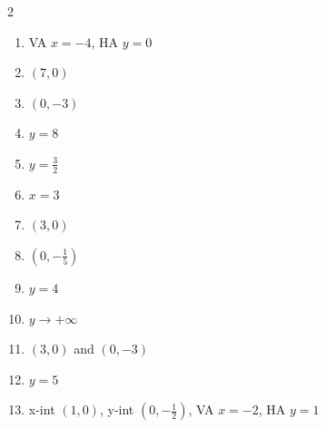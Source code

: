 \documentclass[11pt]{article}
\begin{document}
\begin{keybox}
\begin{multicols}{2}
\small
\begin{enumerate}[leftmargin=*,itemsep=3pt]
  \item VA $x=-4$, HA $y=0$
  \item $(7,0)$
  \item $(0,-3)$
  \item $y=8$
  \item $y=\tfrac32$
  \item $x=3$
  \item $(3,0)$
  \item $(0,-\tfrac15)$
  \item $y=4$
  \item $y\to+\infty$
  \item $(3,0)$ and $(0,-3)$
  \item $y=5$
  \item x-int $(1,0)$, y-int $(0,-\tfrac12)$, VA $x=-2$, HA $y=1$
\end{enumerate}
\end{multicols}
\end{keybox}
\end{document}
